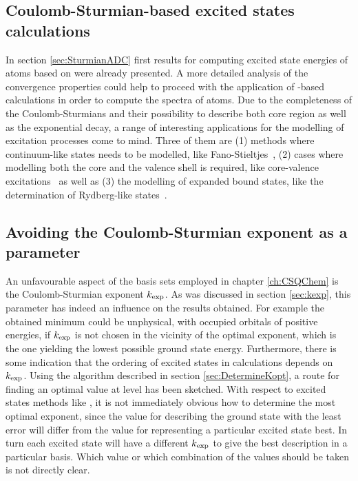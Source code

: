 \subsection{Coulomb-Sturmian-based excited states calculations}
\label{sec:SturmianExcited}
In section \vref{sec:SturmianADC} first results
for computing excited state energies of atoms based on \ADC
were already presented.
A more detailed analysis of the convergence properties
could help to proceed with the application of \CS-based \ADC
calculations in order to compute the spectra of atoms.
Due to the completeness of the Coulomb-Sturmians
and their possibility to describe both core region as well as
the exponential decay,
a range of interesting applications for the modelling
of excitation processes come to mind.
Three of them are
(1) methods where continuum-like states needs to be modelled,
like Fano-Stieltjes~\cite{Feshbach1958,Feshbach1962,Santra2002},
(2) cases where modelling both the core and the valence shell is required,
like core-valence excitations~\cite{Wenzel2014,Wenzel2016}
as well as
(3) the modelling of expanded bound states,
like the determination of Rydberg-like states~\cite{Kaufmann1989,Riss1993}.

\subsection{Avoiding the Coulomb-Sturmian exponent as a parameter}
An unfavourable aspect of the \CS basis sets
employed in chapter \ref{ch:CSQChem} is
the Coulomb-Sturmian exponent $k_\text{exp}$.
As was discussed in section \ref{sec:kexp},
this parameter has indeed an influence on the results obtained.
For example the obtained \SCF minimum could be unphysical,
\ie with occupied orbitals of positive energies,
if $k_\text{exp}$ is not chosen in the vicinity of the optimal exponent,
which is the one yielding the lowest possible \HF ground state energy.
Furthermore, there is some indication
that the ordering of excited states in \ADC calculations depends on $k_\text{exp}$.
Using the algorithm described in section \ref{sec:DetermineKopt},
a route for finding an optimal value at \HF level has been sketched.
With respect to excited states methods like \ADC,
it is not immediately obvious how to determine the most optimal exponent,
since the value for describing the ground state with the least error
will differ from the value for representing a particular excited state best.
In turn each excited state will have a different $k_\text{exp}$
to give the best description in a particular \CS basis.
Which value or which combination of the values should be taken
is not directly clear.

